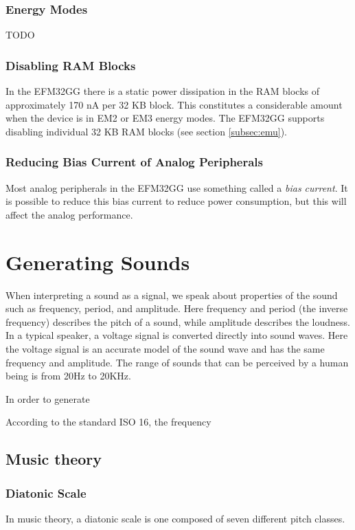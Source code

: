 \subsubsection{Energy Modes}
TODO %

\subsubsection{Disabling RAM Blocks}
In the EFM32GG there is a static power dissipation in the RAM blocks of approximately 170 nA per 32 KB block. This constitutes a considerable amount when the device is in EM2 or EM3 energy modes. The EFM32GG supports disabling individual 32 KB RAM blocks (see section \ref{subsec:emu}).\cite{efm32-energy-optimization}

\subsubsection{Reducing Bias Current of Analog Peripherals}
Most analog peripherals in the EFM32GG use something called a \emph{bias current}. It is possible to reduce this bias current to reduce power consumption, but this will affect the analog performance.\cite{efm32-energy-optimization}



\section{Generating Sounds}
When interpreting a sound as a signal, we speak about properties of the sound such as frequency, period, and amplitude. Here frequency and period (the inverse frequency) describes the pitch of a sound, while amplitude describes the loudness. In a typical speaker, a voltage signal is converted directly into sound waves. Here the voltage signal is an accurate model of the sound wave and has the same frequency and amplitude. The range of sounds that can be perceived by a human being is from 20Hz to 20KHz.\cite{compendium}

In order to generate 

According to the standard ISO 16, the frequency 


\subsection{Music theory}

\subsubsection{Diatonic Scale}
In music theory, a diatonic scale is one composed of seven different pitch classes.
